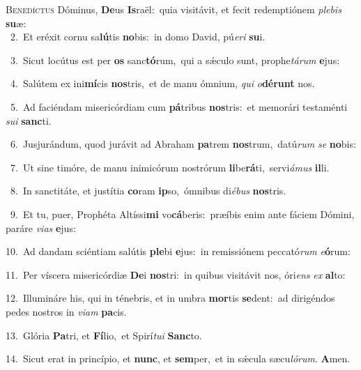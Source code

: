 \lettrine{\initial\textcolor{\initialcolor}{B}}{enedíctus} Dóminus, \textbf{De}\-us \textbf{Is}\-raël:~\star quia visitávit, et fecit redemptiónem \textit{ple}\-\textit{bis} \textbf{su}\-æ:\\
{\numbfont\textcolor{\numbcolor}{~2.}}~Et eréxit cornu sa\-\textbf{lú}\-tis \textbf{no}\-bis:~\star in domo David, pú\-\textit{e}\-\textit{ri} \textbf{su}\-i.\par
{\numbfont\textcolor{\numbcolor}{~3.}}~Sicut locútus est per \textbf{os} sanc\-\textbf{tó}\-rum,~\star qui a sǽculo sunt, prophe\-\textit{tá}\-\textit{rum} \textbf{e}\-jus:\par
{\numbfont\textcolor{\numbcolor}{~4.}}~Salútem ex ini\-\textbf{mí}\-cis \textbf{nos}\-tris,~\star et de manu ómnium, \textit{qui} \textit{o}\-\textbf{dé}\textbf{runt} nos.\par
{\numbfont\textcolor{\numbcolor}{~5.}}~Ad faciéndam misericórdiam cum \textbf{pá}\-tribus \textbf{nos}\-tris:~\star et memorári testaménti \textit{su}\-\textit{i} \textbf{sanc}\-ti.\par
{\numbfont\textcolor{\numbcolor}{~6.}}~Jusjurándum, quod jurávit ad Abraham \textbf{pa}\-trem \textbf{nos}\-trum,~\star datú\textit{rum} \textit{se} \textbf{no}\-bis:\par
{\numbfont\textcolor{\numbcolor}{~7.}}~Ut sine timóre, de manu inimicórum nostrórum \textbf{li}\-be\-\textbf{rá}\-ti,~\star servi\-\textit{á}\-\textit{mus} \textbf{il}\-li.\par
{\numbfont\textcolor{\numbcolor}{~8.}}~In sanctitáte, et justítia \textbf{co}\-ram \textbf{ip}\-so,~\star ómnibus di\-\textit{é}\-\textit{bus} \textbf{nos}\-tris.\par
{\numbfont\textcolor{\numbcolor}{~9.}}~Et tu, puer, Prophéta Altíssi\textbf{mi} vo\-\textbf{cá}\-beris:~\star præíbis enim ante fáciem Dómini, paráre \textit{vi}\-\textit{as} \textbf{e}\-jus:\par
{\numbfont\textcolor{\numbcolor}{10.}}~Ad dandam sciéntiam salútis \textbf{ple}\-bi \textbf{e}\-jus:~\star in remissiónem peccató\textit{rum} \textit{e}\-\textbf{ó}rum:\par
{\numbfont\textcolor{\numbcolor}{11.}}~Per víscera misericórdiæ \textbf{De}\-i \textbf{nos}\-tri:~\star in quibus visitávit nos, óri\textit{ens} \textit{ex} \textbf{al}\-to:\par
{\numbfont\textcolor{\numbcolor}{12.}}~Illumináre his, qui in ténebris, et in umbra \textbf{mor}\-tis \textbf{se}\-dent:~\star ad dirigéndos pedes nostros in \textit{vi}\-\textit{am} \textbf{pa}\-cis.\par
{\numbfont\textcolor{\numbcolor}{13.}}~Glória \textbf{Pa}\-tri, et \textbf{Fí}\-lio,~\star et Spirí\-\textit{tu}\-\textit{i} \textbf{Sanc}\-to.\par
{\numbfont\textcolor{\numbcolor}{14.}}~Sicut erat in princípio, et \textbf{nunc}\-, et \textbf{sem}\-per,~\star et in sǽcula sæcu\-\textit{ló}\-\textit{rum}. \textbf{A}\-men.\par
